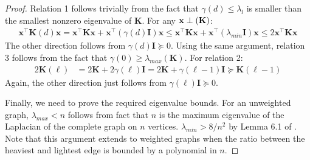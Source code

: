 \documentclass[11pt]{article}
\let\ker\relax
\DeclareMathOperator*{\ker}{ker}
\newcommand{\bv}[1]{\mathbf{#1}}
\begin{document}
\begin{proof}
Relation 1 follows trivially from the fact that $\gamma(d) \leq \lambda_{l}$ is smaller than the smallest nonzero eigenvalue of $\bv{K}$. For any $\bv{x} \perp \ker(\bv{K})$:
\begin{align*}
\bv{x}^\top \bv{K}(d) \bv{x} = \bv{x}^\top \bv{K} \bv{x} + \bv{x}^\top(\gamma(d)\bv{I})\bv{x} \leq \bv{x}^\top \bv{K} \bv{x} + \bv{x}^\top(\lambda_{min}\bv{I})\bv{x} \leq 2 \bv{x}^\top \bv{K} \bv{x}
\end{align*}  
The other direction follows from $\gamma(d)\bv{I} \succeq 0$. Using the same argument, relation 3 follows from the fact that $\gamma(0) \geq \lambda_{max}(\bv{K})$. For relation 2:
\begin{align*}
2\bv{K}(\ell) &= 2\bv{K} + 2\gamma(\ell)\bv{I} = 2\bv{K} + \gamma(\ell-1)\bv{I} \succeq \bv{K}(\ell-1)
\end{align*}
Again, the other direction just follows from  $\gamma(\ell)\bv{I} \succeq 0$. 

Finally, we need to prove the required eigenvalue bounds. For an unweighted graph, $\lambda_{max} < n$ follows from fact that $n$ is the maximum eigenvalue of the Laplacian of the complete graph on $n$ vertices. $\lambda_{min} > 8/n^2$ by Lemma 6.1 of \cite{spielmanTengSolver}.
Note that this argument extends to weighted graphs when the ratio between the heaviest and lightest edge is bounded by a polynomial in $n$.
\end{proof}



 
\end{document}

